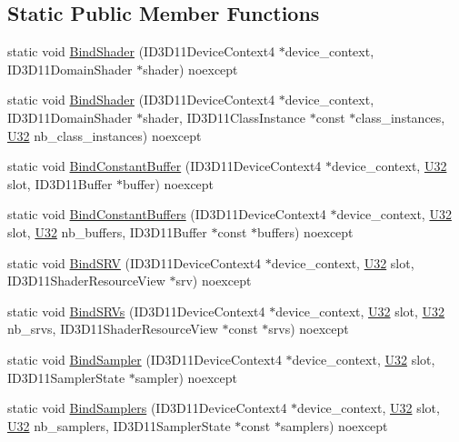 \subsection*{Static Public Member Functions}
\begin{DoxyCompactItemize}
\item 
static void \hyperlink{structmage_1_1_pipeline_1_1_d_s_ad41e00da4b90a22d099042f64b5d19af}{Bind\+Shader} (I\+D3\+D11\+Device\+Context4 $\ast$device\+\_\+context, I\+D3\+D11\+Domain\+Shader $\ast$shader) noexcept
\item 
static void \hyperlink{structmage_1_1_pipeline_1_1_d_s_a940852a93a11bcb9d25ec9ce805c7df6}{Bind\+Shader} (I\+D3\+D11\+Device\+Context4 $\ast$device\+\_\+context, I\+D3\+D11\+Domain\+Shader $\ast$shader, I\+D3\+D11\+Class\+Instance $\ast$const $\ast$class\+\_\+instances, \hyperlink{namespacemage_a41c104c036fba3756a74e19f793eeaa1}{U32} nb\+\_\+class\+\_\+instances) noexcept
\item 
static void \hyperlink{structmage_1_1_pipeline_1_1_d_s_a14a900b6264eb1e623a7bbb72e313ed4}{Bind\+Constant\+Buffer} (I\+D3\+D11\+Device\+Context4 $\ast$device\+\_\+context, \hyperlink{namespacemage_a41c104c036fba3756a74e19f793eeaa1}{U32} slot, I\+D3\+D11\+Buffer $\ast$buffer) noexcept
\item 
static void \hyperlink{structmage_1_1_pipeline_1_1_d_s_aa7d40badfd8eef03f2b820d0d584ae90}{Bind\+Constant\+Buffers} (I\+D3\+D11\+Device\+Context4 $\ast$device\+\_\+context, \hyperlink{namespacemage_a41c104c036fba3756a74e19f793eeaa1}{U32} slot, \hyperlink{namespacemage_a41c104c036fba3756a74e19f793eeaa1}{U32} nb\+\_\+buffers, I\+D3\+D11\+Buffer $\ast$const $\ast$buffers) noexcept
\item 
static void \hyperlink{structmage_1_1_pipeline_1_1_d_s_a9abe56eb5d375c0fd2ab96564f91c769}{Bind\+S\+RV} (I\+D3\+D11\+Device\+Context4 $\ast$device\+\_\+context, \hyperlink{namespacemage_a41c104c036fba3756a74e19f793eeaa1}{U32} slot, I\+D3\+D11\+Shader\+Resource\+View $\ast$srv) noexcept
\item 
static void \hyperlink{structmage_1_1_pipeline_1_1_d_s_a7d6ff71acd04b276a70ff608cee20e79}{Bind\+S\+R\+Vs} (I\+D3\+D11\+Device\+Context4 $\ast$device\+\_\+context, \hyperlink{namespacemage_a41c104c036fba3756a74e19f793eeaa1}{U32} slot, \hyperlink{namespacemage_a41c104c036fba3756a74e19f793eeaa1}{U32} nb\+\_\+srvs, I\+D3\+D11\+Shader\+Resource\+View $\ast$const $\ast$srvs) noexcept
\item 
static void \hyperlink{structmage_1_1_pipeline_1_1_d_s_aa2f6c52f63b489966dd53879f152e80b}{Bind\+Sampler} (I\+D3\+D11\+Device\+Context4 $\ast$device\+\_\+context, \hyperlink{namespacemage_a41c104c036fba3756a74e19f793eeaa1}{U32} slot, I\+D3\+D11\+Sampler\+State $\ast$sampler) noexcept
\item 
static void \hyperlink{structmage_1_1_pipeline_1_1_d_s_a1a2b41ee650dc083b0764a0ea3e4c0d8}{Bind\+Samplers} (I\+D3\+D11\+Device\+Context4 $\ast$device\+\_\+context, \hyperlink{namespacemage_a41c104c036fba3756a74e19f793eeaa1}{U32} slot, \hyperlink{namespacemage_a41c104c036fba3756a74e19f793eeaa1}{U32} nb\+\_\+samplers, I\+D3\+D11\+Sampler\+State $\ast$const $\ast$samplers) noexcept
\end{DoxyCompactItemize}
